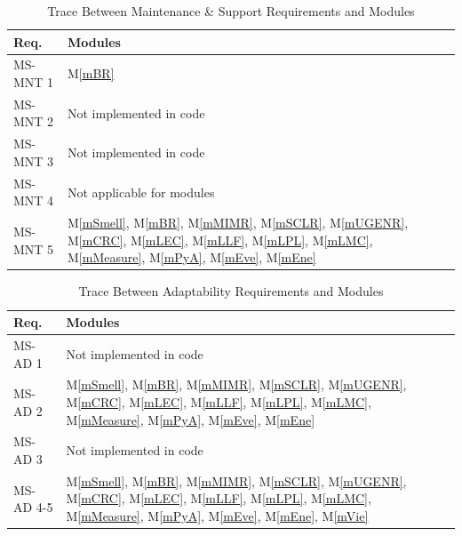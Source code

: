\documentclass[12pt, titlepage]{article}
\newcommand{\mref}[1]{M\ref{#1}}
\begin{document}
\begin{table}[H]
  \centering
  \begin{tabular}{p{} p{}}
    \toprule \textbf{Req.} & \textbf{Modules}\\
    \midrule
    MS-MNT 1 & \mref{mBR}\\
    MS-MNT 2 & Not implemented in code \\
    MS-MNT 3 & Not implemented in code \\
    MS-MNT 4 & Not applicable for modules\\
    MS-MNT 5 & \mref{mSmell}, \mref{mBR}, \mref{mMIMR}, \mref{mSCLR}, \mref{mUGENR}, \mref{mCRC}, \mref{mLEC}, \mref{mLLF}, \mref{mLPL}, \mref{mLMC}, \mref{mMeasure}, \mref{mPyA}, \mref{mEve}, \mref{mEne} \\
    \bottomrule
  \end{tabular}
  \caption{Trace Between Maintenance \& Support Requirements and Modules}
  \label{tab:MS-mod}
\end{table}

\begin{table}[H]
  \centering
  \begin{tabular}{p{} p{}}
    \toprule \textbf{Req.} & \textbf{Modules}\\
    \midrule
    MS-AD 1 & Not implemented in code \\
    MS-AD 2 & \mref{mSmell}, \mref{mBR}, \mref{mMIMR}, \mref{mSCLR}, \mref{mUGENR}, \mref{mCRC}, \mref{mLEC}, \mref{mLLF}, \mref{mLPL}, \mref{mLMC}, \mref{mMeasure}, \mref{mPyA}, \mref{mEve}, \mref{mEne} \\
    MS-AD 3 & Not implemented in code \\
    MS-AD 4-5 & \mref{mSmell}, \mref{mBR}, \mref{mMIMR}, \mref{mSCLR}, \mref{mUGENR}, \mref{mCRC}, \mref{mLEC}, \mref{mLLF}, \mref{mLPL}, \mref{mLMC}, \mref{mMeasure}, \mref{mPyA}, \mref{mEve}, \mref{mEne}, \mref{mVie} \\
    \bottomrule
  \end{tabular}
  \caption{Trace Between Adaptability Requirements and Modules}
  \label{tab:MS-mod}
\end{table}
\end{document}
